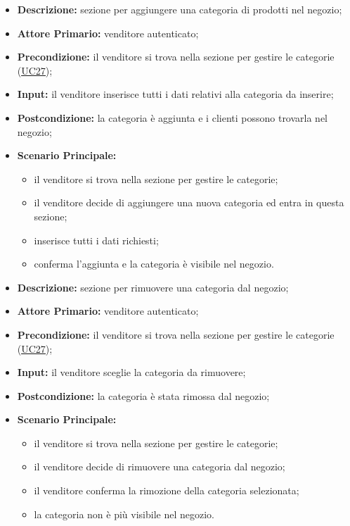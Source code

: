 \label{sec:UC27.1}
\begin{itemize}
    \item \textbf{Descrizione:} sezione per aggiungere una categoria di prodotti nel negozio;
    \item \textbf{Attore Primario:} venditore autenticato;
    \item \textbf{Precondizione:} il venditore si trova nella sezione per gestire le categorie (\hyperref[sec:UC27]{\underline{UC27}});
    \item \textbf{Input:} il venditore inserisce tutti i dati relativi alla categoria da inserire;
    \item \textbf{Postcondizione:} la categoria è aggiunta e i clienti possono trovarla nel negozio;
    \item \textbf{Scenario Principale:}
          \begin{itemize}
              \item il venditore si trova nella sezione per gestire le categorie;
              \item il venditore decide di aggiungere una nuova categoria ed entra in questa sezione;
              \item inserisce tutti i dati richiesti;
              \item conferma l'aggiunta e la categoria è visibile nel negozio.
          \end{itemize}
\end{itemize}
\label{sec:UC27.2}
\begin{itemize}
    \item \textbf{Descrizione:} sezione per rimuovere una categoria dal negozio;
    \item \textbf{Attore Primario:} venditore autenticato;
    \item \textbf{Precondizione:} il venditore si trova nella sezione per gestire le categorie (\hyperref[sec:UC27]{\underline{UC27}});
    \item \textbf{Input:} il venditore sceglie la categoria da rimuovere;
    \item \textbf{Postcondizione:} la categoria è stata rimossa dal negozio;
    \item \textbf{Scenario Principale:}
          \begin{itemize}
              \item il venditore si trova nella sezione per gestire le categorie;
              \item il venditore decide di rimuovere una categoria dal negozio;
              \item il venditore conferma la rimozione della categoria selezionata;
              \item la categoria non è più visibile nel negozio.
          \end{itemize}
\end{itemize}

